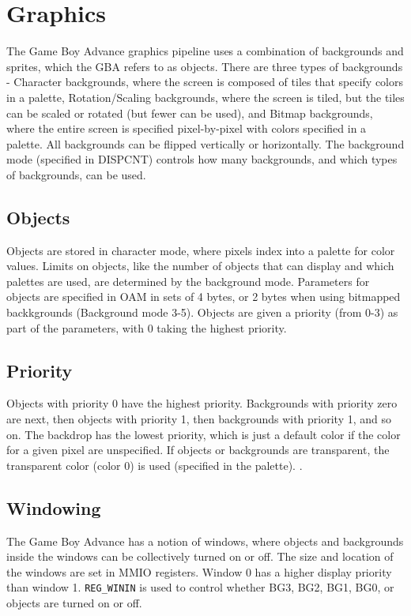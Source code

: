 \documentclass[11pt,a4paper,draft]{article}
\begin{document}
	\section{Graphics}
	The Game Boy Advance graphics pipeline uses a combination of backgrounds and sprites, which the GBA refers to as objects. There are three types of backgrounds - Character backgrounds, where the screen is composed of tiles that specify colors in a palette, Rotation/Scaling backgrounds, where the screen is tiled, but the tiles can be scaled or rotated (but fewer can be used), and Bitmap backgrounds, where the entire screen is specified pixel-by-pixel with colors specified in a palette. All backgrounds can be flipped vertically or horizontally. The background mode (specified in DISPCNT) controls how many backgrounds, and which types of backgrounds, can be used. \cite{GBAManual}
	
	\subsection{Objects}
	Objects are stored in character mode, where pixels index into a palette for color values. Limits on objects, like the number of objects that can display and which palettes are used, are determined by the background mode. Parameters for objects are specified in OAM in sets of 4 bytes, or 2 bytes when using bitmapped backkgrounds (Background mode 3-5). Objects are given a priority (from 0-3) as part of the parameters, with 0 taking the highest priority. \cite{GBAManual}
	
	\subsection{Priority}
	Objects with priority 0 have the highest priority. Backgrounds with priority zero are next, then objects with priority 1, then backgrounds with priority 1, and so on. The backdrop has the lowest priority, which is just a default color if the color for a given pixel are unspecified. If objects or backgrounds are transparent, the transparent color (color 0) is used (specified in the palette). \cite{GBAManual}. 
	
	\subsection{Windowing}
	The Game Boy Advance has a notion of windows, where objects and backgrounds inside the windows can be collectively turned on or off. The size and location of the windows are set in MMIO registers. Window 0 has a higher display priority than window 1. \texttt{REG\_WININ} is used to control whether BG3, BG2, BG1, BG0, or objects are turned on or off. \cite{GBAManual}
	
\end{document}
